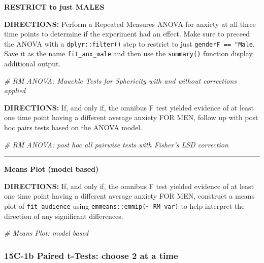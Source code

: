 \documentclass[
]{article}
\newenvironment{Shaded}{\begin{snugshade}}{\end{snugshade}}
\newcommand{\CommentTok}[1]{\textcolor[rgb]{0.56,0.35,0.01}{\textit{#1}}}
\begin{document}
\clearpage

\textbf{RESTRICT to just MALES}

\textbf{DIRECTIONS:} Perform a Repeated Measures ANOVA for anxiety at
all three time points to determine if the experiment had an effect. Make
sure to preceed the ANOVA with a \texttt{dplyr::filter()} step to
restrict to just \texttt{genderF\ ==\ "Male}. Save it as the name
\texttt{fit\_anx\_male} and then use the \texttt{summary()} function
display additional output.

\begin{Shaded}
\begin{Highlighting}[]
\CommentTok{# RM ANOVA: Mauchle Tests for Sphericity with and without corrections applied}
\end{Highlighting}
\end{Shaded}

\clearpage

\textbf{DIRECTIONS:} If, and only if, the omnibus F test yielded
evidence of at least one time point having a different average anxiety
FOR MEN, follow up with post hoc pairs tests based on the ANOVA model.

\begin{Shaded}
\begin{Highlighting}[]
\CommentTok{# RM ANOVA: post hoc all pairwise tests with Fisher's LSD correction}
\end{Highlighting}
\end{Shaded}

\begin{center}\rule{0.5\linewidth}{\linethickness}\end{center}

\textbf{Means Plot (model based)}

\textbf{DIRECTIONS:} If, and only if, the omnibus F test yielded
evidence of at least one time point having a different average anxiety
FOR MEN, construct a means plot of \texttt{fit\_audience} using
\texttt{emmeans::emmip(\textasciitilde{}\ RM\_var)} to help interpret
the direction of any significant differences.

\begin{Shaded}
\begin{Highlighting}[]
\CommentTok{# Means Plot: model based}
\end{Highlighting}
\end{Shaded}

\clearpage

\hypertarget{c-1b-paired-t-tests-choose-2-at-a-time}{%
\subsubsection{15C-1b Paired t-Tests: choose 2 at a
time}\label{c-1b-paired-t-tests-choose-2-at-a-time}}
\end{document}

